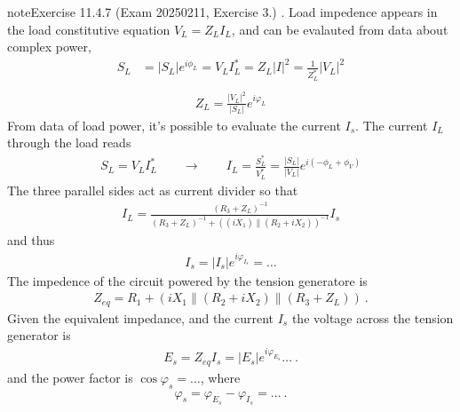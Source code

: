\documentclass[letterpaper,10pt,english]{jupyterBook}
\begin{document}
\begin{sphinxadmonition}{note}{Exercise 11.4.7 (Exam 2025\sphinxhyphen{}02\sphinxhyphen{}11, Exercise 3.)}
\sphinxAtStartPar
{}. Load impedence appears in the load constitutive equation \(V_L = Z_L I_L\), and can be evalauted from data about complex power,
\begin{equation*}
\begin{split}
   S_L  & = |S_L| e^{i \phi_L} = V_L I_L^* = Z_L |I|^2 = \frac{1}{Z_L^*} |V_L|^2 \\ 
\end{split}
\end{equation*}\begin{equation*}
\begin{split}Z_L = \frac{|V_L|^2}{|S_L|} e^{i \varphi_L}\end{split}
\end{equation*}
\sphinxAtStartPar
{} From data of load power, it’s possible to evaluate the current \(I_s\). The current \(I_L\) through the load reads
\begin{equation*}
\begin{split}S_L = V_L I_L^* \qquad \rightarrow \qquad I_L = \frac{S_L^*}{V_L^*} = \frac{|S_L|}{|V_L|} e^{i(-\phi_L + \phi_V)}\end{split}
\end{equation*}
\sphinxAtStartPar
The three parallel sides act as current divider so that
\begin{equation*}
\begin{split}I_L = \frac{(R_3+Z_L)^{-1}}{(R_3+Z_L)^{-1} + ( (i X_1 ) \parallel (R_2 + i X_2) )^{-1}} I_s\end{split}
\end{equation*}
\sphinxAtStartPar
and thus
\begin{equation*}
\begin{split}I_s = |I_s| e^{i \varphi_{I_s}} = \dots\end{split}
\end{equation*}
\sphinxAtStartPar
{} The impedence of the circuit powered by the tension generatore is
\begin{equation*}
\begin{split}Z_{eq} = R_1 + ( i X_1 \parallel (R_2 + i X_2) \parallel (R_3 + Z_L) ) \ .\end{split}
\end{equation*}
\sphinxAtStartPar
Given the equivalent impedance, and the current \(I_s\) the voltage across the tension generator is
\begin{equation*}
\begin{split}E_s = Z_{eq} I_s = |E_s| e^{i \varphi_{E_s}} \dots \ .\end{split}
\end{equation*}
\sphinxAtStartPar
and the power factor is \(\cos \varphi_s = \dots\), where
\begin{equation*}
\begin{split}\varphi_s = \varphi_{E_s} - \varphi_{I_s} = \dots \ . \end{split}
\end{equation*}\end{sphinxadmonition}
 \label{exercise:exam-25-01-22-exe-02}
\end{document}
